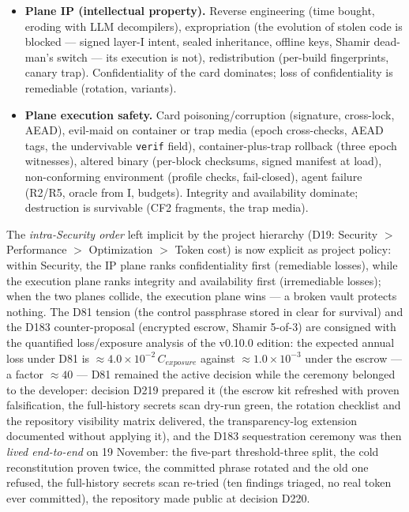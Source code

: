 \documentclass[11pt,a4paper]{article}
\newcommand{\code}[1]{\texttt{\small #1}}
\begin{document}
\begin{itemize}
\item \textbf{Plane IP (intellectual property).} Reverse engineering
(time bought, eroding with LLM decompilers), expropriation (the
evolution of stolen code is blocked --- signed layer-I intent, sealed
inheritance, offline keys, Shamir dead-man's switch --- its execution
is not), redistribution (per-build fingerprints, canary trap).
Confidentiality of the card dominates; loss of confidentiality is
remediable (rotation, variants).
\item \textbf{Plane execution safety.} Card poisoning/corruption
(signature, cross-lock, AEAD), evil-maid on container or trap media
(epoch cross-checks, AEAD tags, the undervivable \code{verif} field),
container-plus-trap rollback (three epoch witnesses), altered binary
(per-block checksums, signed manifest at load), non-conforming
environment (profile checks, fail-closed), agent failure (R2/R5,
oracle from I, budgets). Integrity and availability dominate;
destruction is survivable (CF2 fragments, the trap media).
\end{itemize}

The \emph{intra-Security order} left implicit by the project hierarchy
(D19: Security $>$ Performance $>$ Optimization $>$ Token cost) is now
explicit as project policy: within Security, the IP plane ranks
confidentiality first (remediable losses), while the execution plane
ranks integrity and availability first (irremediable losses); when the
two planes collide, the execution plane wins --- a broken vault protects
nothing. The D81 tension (the control passphrase stored in clear for
survival) and the D183 counter-proposal (encrypted escrow, Shamir
5-of-3) are consigned with the quantified loss/exposure analysis of the
v0.10.0 edition: the expected annual loss under D81 is
$\approx 4.0 \times 10^{-2}\,C_{exposure}$ against
$\approx 1.0 \times 10^{-3}$ under the escrow --- a factor $\approx 40$
--- D81 remained the active decision while the ceremony belonged to
the developer: decision D219 prepared it (the escrow kit refreshed
with proven falsification, the full-history secrets scan dry-run
green, the rotation checklist and the repository visibility matrix
delivered, the transparency-log extension documented without applying
it), and the D183 sequestration ceremony was then \emph{lived
end-to-end} on 19 November: the five-part threshold-three split, the
cold reconstitution proven twice, the committed phrase rotated and the
old one refused, the full-history secrets scan re-tried (ten findings
triaged, no real token ever committed), the repository made public at
decision D220.
\end{document}
